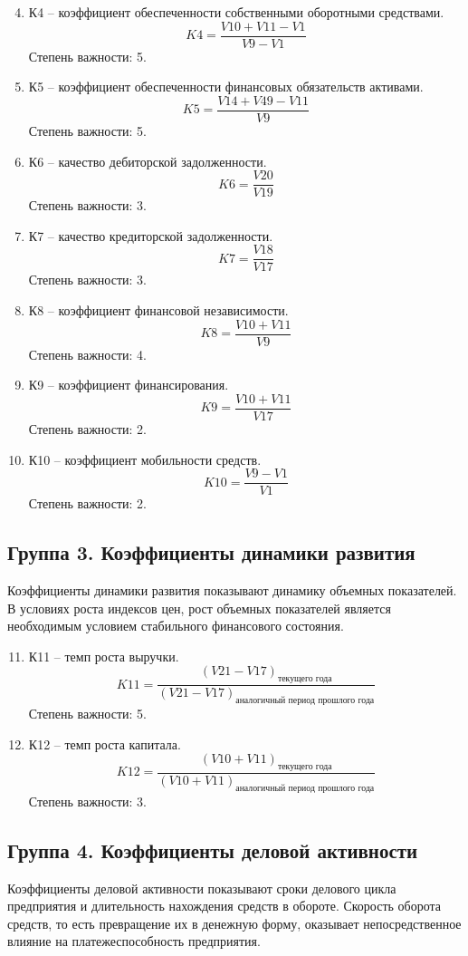 \documentclass[14pt,a4paper]{extarticle}
\begin{document}
\begin{enumerate}
\setcounter{enumi}{3}
\item К4 – коэффициент обеспеченности собственными оборотными средствами.
\[
K4 = \frac{V10 + V11 - V1}{V9 - V1}
\]
Степень важности: 5.

\item К5 – коэффициент обеспеченности финансовых обязательств активами.
\[
K5 = \frac{V14 + V49 - V11}{V9}
\]
Степень важности: 5.

\item К6 – качество дебиторской задолженности.
\[
K6 = \frac{V20}{V19}
\]
Степень важности: 3.

\item К7 – качество кредиторской задолженности.
\[
K7 = \frac{V18}{V17}
\]
Степень важности: 3.

\item К8 – коэффициент финансовой независимости.
\[
K8 = \frac{V10 + V11}{V9}
\]
Степень важности: 4.

\item К9 – коэффициент финансирования.
\[
K9 = \frac{V10 + V11}{V17}
\]
Степень важности: 2.

\item К10 – коэффициент мобильности средств.
\[
K10 = \frac{V9 - V1}{V1}
\]
Степень важности: 2.
\end{enumerate}

\subsection*{Группа 3. Коэффициенты динамики развития}
Коэффициенты динамики развития показывают динамику объемных показателей. В условиях роста индексов цен, рост объемных показателей является необходимым условием стабильного финансового состояния.

\begin{enumerate}
\setcounter{enumi}{10}
\item К11 – темп роста выручки.
\[
K11 = \frac{(V21 - V17)_{\text{текущего года}}}{(V21 - V17)_{\text{аналогичный период прошлого года}}}
\]
Степень важности: 5.

\item К12 – темп роста капитала.
\[
K12 = \frac{(V10 + V11)_{\text{текущего года}}}{(V10 + V11)_{\text{аналогичный период прошлого года}}}
\]
Степень важности: 3.
\end{enumerate}

\subsection*{Группа 4. Коэффициенты деловой активности}
Коэффициенты деловой активности показывают сроки делового цикла предприятия и длительность нахождения средств в обороте. Скорость оборота средств, то есть превращение их в денежную форму, оказывает непосредственное влияние на платежеспособность предприятия.
\end{document}
